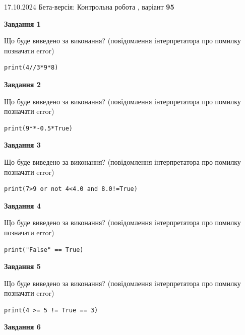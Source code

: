 \documentclass[12pt, ukrainian]{article}
\begin{document}
{\Large{17.10.2024 Бета-версія: Контрольна робота , варіант  \No \textbf { 95 }\par}}
{
\begin {large}
{\begin {center}\textbf{Завдання 1}\end {center}}

Що буде виведено за виконання? (повідомлення інтерпретатора про помилку позначати error)\par
\begin{verbatim}
print(4//3*9*8)
\end{verbatim}

{\begin {center}\textbf{Завдання 2}\end {center}}

Що буде виведено за виконання? (повідомлення інтерпретатора про помилку позначати error)\par
\begin{verbatim}
print(9**-0.5*True)
\end{verbatim}

{\begin {center}\textbf{Завдання 3}\end {center}}

Що буде виведено за виконання? (повідомлення інтерпретатора про помилку позначати error)\par
\begin{verbatim}
print(7>9 or not 4<4.0 and 8.0!=True)
\end{verbatim}

{\begin {center}\textbf{Завдання 4}\end {center}}

Що буде виведено за виконання? (повідомлення інтерпретатора про помилку позначати error)\par
\begin{verbatim}
print("False" == True)
\end{verbatim}

{\begin {center}\textbf{Завдання 5}\end {center}}

Що буде виведено за виконання? (повідомлення інтерпретатора про помилку позначати error)\par
\begin{verbatim}
print(4 >= 5 != True == 3)
\end{verbatim}

{\begin {center}\textbf{Завдання 6}\end {center}}


\end{large}}
\end{document}
